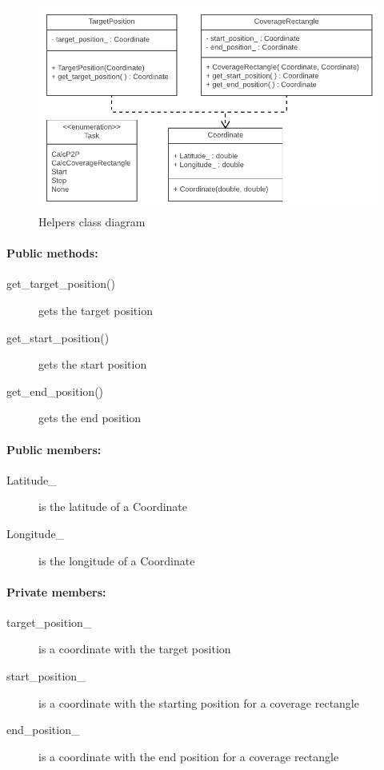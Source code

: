 \begin{figure}[H]
\centering
\includegraphics[width=1\linewidth]{Images/Design/Helpers_class_diagram}
\caption{Helpers class diagram}
\label{fig:helpers}
\end{figure}

\paragraph{Public methods:}
\begin{adjustwidth}{2.5em}{0pt}\begin{description}
		\item [get_target_position()] gets the target position
		\item [get_start_position()] gets the start position
		\item [get_end_position()] gets the end position
\end{description}\end{adjustwidth}

\paragraph{Public members:}
\begin{adjustwidth}{2.5em}{0pt}\begin{description}
		\item [Latitude_] is the latitude of a Coordinate
		\item [Longitude_] is the longitude of a Coordinate
\end{description}\end{adjustwidth}

\paragraph{Private members:}
\begin{adjustwidth}{2.5em}{0pt}\begin{description}
		\item [target_position_] is a coordinate with the target position
		\item [start_position_] is a coordinate with the starting position for a coverage rectangle
		\item [end_position_] is a coordinate with the end position for a coverage rectangle
\end{description}\end{adjustwidth}

